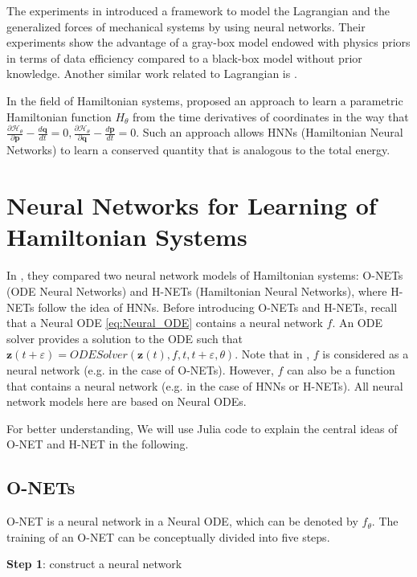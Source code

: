 \documentclass[
	parskip, 			   %
	twoside, 			   %
	DIV=14, 			   %
	BCOR=15.0mm, 		   %
	headsepline, 		   %
	open=right, 		   %
	captions=tableheading, %
	bibliography=totoc,    %
	numbers=noenddot       %
]{scrreprt}
\begin{document}
The experiments in \cite{gupta2019general} introduced a framework to model the Lagrangian and the generalized forces of mechanical systems by using neural networks. Their experiments show the advantage of a gray-box model endowed with physics priors in terms of data efficiency compared to a black-box model without prior knowledge. Another similar work related to Lagrangian is \cite{lutter2019deep}.

In the field of Hamiltonian systems, \cite{greydanus2019hamiltonian} proposed an approach to learn a parametric Hamiltonian function $H_{\theta}$ from the time derivatives of coordinates in the way that $\frac{\partial \mathcal{H}_{\theta}}{\partial \mathbf{p}} - \frac{d\mathbf{q}}{dt} = 0, \frac{\partial \mathcal{H}_{\theta}}{\partial \mathbf{q}} - \frac{d\mathbf{p}}{dt} = 0 $. Such an approach allows HNNs (Hamiltonian Neural Networks) to learn a conserved quantity that is analogous to the total energy.

\section{Neural Networks for Learning of Hamiltonian Systems}
In \cite{chen2019symplectic}, they compared two neural network models of Hamiltonian systems: O-NETs (ODE Neural Networks) and H-NETs (Hamiltonian Neural Networks), where H-NETs follow the idea of HNNs. 
Before introducing O-NETs and H-NETs, recall that a Neural ODE \ref{eq:Neural_ODE} contains a neural network $f$. An ODE solver provides a solution to the ODE such that $\mathbf{z}(t+\varepsilon) = ODESolver(\mathbf{z}(t), f, t, t+\varepsilon , \theta)$. Note that in \cite{chen2019symplectic}, $f$ is considered as a neural network (e.g. in the case of O-NETs). However, $f$ can also be a function that contains a neural network (e.g. in the case of HNNs or H-NETs). All neural network models here are based on Neural ODEs.

For better understanding, We will use Julia code to explain the central ideas of O-NET and H-NET in the following.

\subsection{O-NETs}
O-NET is a neural network in a Neural ODE, which can be denoted by $f_{\theta}$. The training of an O-NET can be conceptually divided into five steps.

\textbf{Step 1}: construct a neural network
\end{document}
